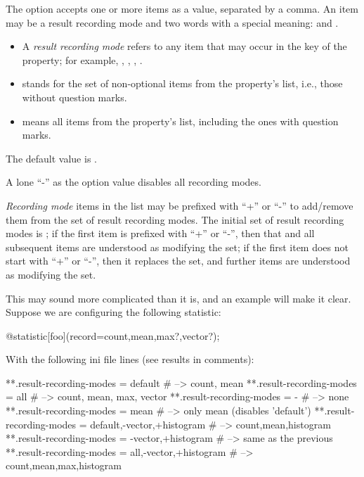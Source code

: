 The  option accepts one or more items as a
value, separated by a comma. An item may be a result recording mode and two
words with a special meaning:  and .

\begin{itemize}
  \item A \textit{result recording mode} refers to any item that may occur in the
     key of the  property; for example, ,
    , , .
  \item {} stands for the set of non-optional items from the
     property's  list, i.e., those without question
    marks.
  \item {} means all items from the  property's
     list, including the ones with question marks.
\end{itemize}

The default value is .

A lone ``-'' as the option value disables all recording modes.

\textit{Recording mode} items in the list may be prefixed with ``+'' or
``-'' to add/remove them from the set of result recording modes. The
initial set of result recording modes is ; if the first item
is prefixed with ``+'' or ``-'', then that and all subsequent items are
understood as modifying the set; if the first item does not start with
``+'' or ``-'', then it replaces the set, and further items are understood
as modifying the set.

This may sound more complicated than it is, and an example will make it clear.
Suppose we are configuring the following statistic:

\begin{ned}
@statistic[foo](record=count,mean,max?,vector?);
\end{ned}

With the following ini file lines (see results in comments):

\begin{inifile}
**.result-recording-modes = default  # --> count, mean
**.result-recording-modes = all      # --> count, mean, max, vector
**.result-recording-modes = -        # --> none
**.result-recording-modes = mean     # --> only mean (disables 'default')
**.result-recording-modes = default,-vector,+histogram # --> count,mean,histogram
**.result-recording-modes = -vector,+histogram         # --> same as the previous
**.result-recording-modes = all,-vector,+histogram  # --> count,mean,max,histogram
\end{inifile}

